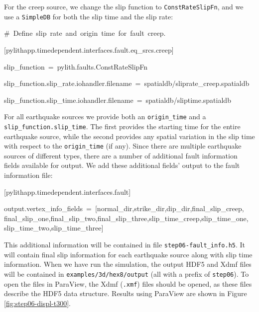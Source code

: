 For the creep source, we change the slip function to \texttt{ConstRateSlipFn},
and we use a \texttt{SimpleDB} for both the slip time and the slip
rate:
\begin{lyxcode}
\#~Define~slip~rate~and~origin~time~for~fault~creep.

{[}pylithapp.timedependent.interfaces.fault.eq\_srcs.creep{]}

slip\_function~=~pylith.faults.ConstRateSlipFn

slip\_function.slip\_rate.iohandler.filename~=~spatialdb/sliprate\_creep.spatialdb

slip\_function.slip\_time.iohandler.filename~=~spatialdb/sliptime.spatialdb
\end{lyxcode}
For all earthquake sources we provide both an \texttt{origin\_time}
and a \texttt{slip\_function.slip\_time}. The first provides the starting
time for the entire earthquake source, while the second provides any
spatial variation in the slip time with respect to the \texttt{origin\_time}
(if any). Since there are multiple earthquake sources of different
types, there are a number of additional fault information fields available
for output. We add these additional fields' output to the fault information
file:
\begin{lyxcode}
{[}pylithapp.timedependent.interfaces.fault{]}

output.vertex\_info\_fields~=~{[}normal\_dir,strike\_dir,dip\_dir,final\_slip\_creep,~\\
final\_slip\_one,final\_slip\_two,final\_slip\_three,slip\_time\_creep,slip\_time\_one,~\\
slip\_time\_two,slip\_time\_three{]}
\end{lyxcode}
This additional information will be contained in file \texttt{step06-fault\_info.h5}.
It will contain final slip information for each earthquake source
along with slip time information. When we have run the simulation,
the output HDF5 and Xdmf files will be contained in \texttt{examples/3d/hex8/output}
(all with a prefix of \texttt{step06}). To open the files in ParaView,
the Xdmf (\texttt{.xmf}) files should be opened, as these files describe
the HDF5 data structure. Results using ParaView are shown in Figure
\ref{fig:step06-displ-t300}.
